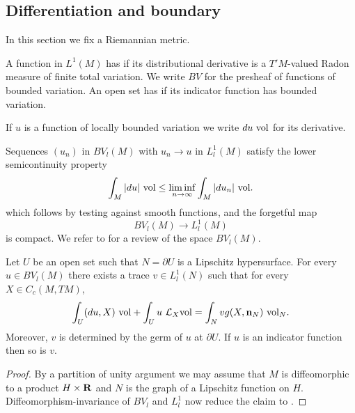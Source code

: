 \subsection{Differentiation and boundary}
In this section we fix a Riemannian metric.

\begin{definition}
A function in $L^1(M)$ has  if its distributional derivative is a $T'M$-valued Radon measure of finite total variation.
We write $BV$ for the presheaf of functions of bounded variation.
An open set has  if its indicator function has bounded variation.
\end{definition}

\begin{notation}
If $u$ is a function of locally bounded variation we write $du ~\mathrm{vol}$ for its derivative.
\end{notation}

Sequences $(u_n)$ in $BV_l(M)$ with $u_n \to u$ in $L^1_l(M)$ satisfy the lower semicontinuity property
\begin{equation}
\label{RieszMarkovDistr}
\int_M |du| ~\mathrm{vol} \leq \liminf_{n \to \infty} \int_M |du_n| ~\mathrm{vol}.
\end{equation}
which follows by testing against smooth functions, and the forgetful map
\begin{equation}\label{Forget}
BV_l(M) \to L^1_l(M)
\end{equation}
is compact. We refer to \cite[Chapter 1]{Giusti77} for a review of the space $BV_l(M)$.

\begin{proposition}\label{traces}
Let $U$ be an open set such that $N = \partial U$ is a Lipschitz hypersurface.
For every $u \in BV_l(M)$ there exists a trace $v \in L^1_l(N)$ such that for every $X \in C_c(M, TM)$,
\begin{equation}\label{Miranda IBP}
\int_U (du, X) ~\mathrm{vol} + \int_U u ~\mathcal L_X\mathrm{vol} = \int_N vg(X, \mathbf n_N) ~\mathrm{vol}_N.
\end{equation}
Moreover, $v$ is determined by the germ of $u$ at $\partial U$.
If $u$ is an indicator function then so is $v$.
\end{proposition}
\begin{proof}
By a partition of unity argument we may assume that $M$ is diffeomorphic to a product $H \times \mathbf{R}$ and $N$ is the graph of a Lipschitz function on $H$.
Diffeomorphism-invariance of $BV_l$ and $L^1_l$ now reduce the claim to \cite[Teorema 1]{Miranda67}.
\end{proof}

